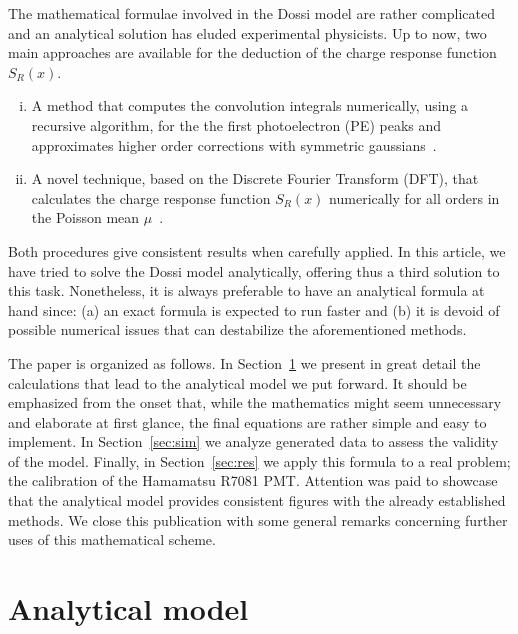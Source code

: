 \documentclass[preprint,12pt]{elsarticle}
\begin{document}
The mathematical formulae involved in the Dossi model are rather complicated and an analytical solution has eluded experimental physicists. 
Up to now, two main approaches are available for the deduction of the charge response function $S_R(x)$.
\begin{enumerate}[i.]
\item  A method that computes the convolution integrals numerically, using a recursive algorithm, 
for the the first photoelectron (PE) peaks and approximates higher order corrections with symmetric gaussians~\cite{dossi}. 
\item A novel technique, based on the Discrete Fourier Transform (DFT), that calculates the charge response function $S_R(x)$ numerically for all orders in the Poisson mean $\mu$~\cite{me}. 
\end{enumerate}
Both procedures give consistent results when carefully applied. 
In this article, we have tried to solve the Dossi model analytically, offering thus a third solution to this task. 
Nonetheless, it is always preferable to have an analytical formula at hand since: 
(a) an exact formula is expected to run faster and 
(b) it is devoid of possible numerical issues that can destabilize the aforementioned methods.  

The paper is organized as follows. 
In Section~\ref{sec:mod} we present in great detail the calculations that lead to the analytical model we put forward. 
It should be emphasized from the onset that, while the mathematics might seem unnecessary and elaborate at first glance, the final equations are rather simple and easy to implement. 
In Section~\ref{sec:sim} we analyze generated data to assess the validity of the model. 
Finally, in Section~\ref{sec:res} we apply this formula to a real problem; the calibration of the Hamamatsu R7081 PMT. 
Attention was paid to showcase that the analytical model provides consistent figures with the already established methods. 
We close this publication with some general remarks concerning further uses of this mathematical scheme. 


\section{Analytical model}
\label{sec:mod}
%
\end{document}

